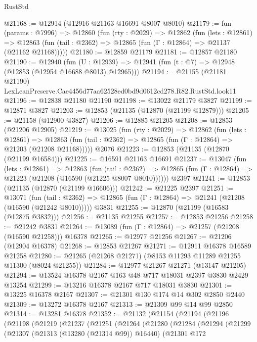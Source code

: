 \begin{lexlean}{RustStd}
\begin{coremodule}
@21168 := @12914 (@12916 @21163 @16691 @8007 @8010)
@21179 := fun (params : @7996) =>
  @12860
    (fun (rty : @2029) =>
    @12862
      (fun (lets : @12861) =>
      @12863 (fun (tail : @2362) => @12865 (fun (Γ : @12864) => @21137 (@21162 @21168)))))
@21180 := @12859 @21179
@21181 := @12857 @21180
@21190 := @12940
    (fun (U : @12939) => @12941 (fun (t : @7) => @12948 (@12853 (@12954 @16688 @8013) @12965)))
@21194 := @21155
    (@21181 @21190)
    LexLeanPreserve.Cae4456d77aa62528ed0bd9d0612cd278.R82.RustStd.look11
@21196 := @12838 @21180 @21190
@21198 := @13022 @21179 @3827
@21199 := @12871 @3827
@21203 := @12853 (@21135 (@12870 (@21199 @12879)))
@21205 := @21158 (@12900 @3827)
@21206 := @12885 @21205
@21208 := @12853 (@21206 @12905)
@21219 := @13025
    (fun (rty : @2029) =>
    @12862
      (fun (lets : @12861) =>
      @12863 (fun (tail : @2362) => @12865 (fun (Γ : @12864) => @21203 (@21208 @21168)))))
    @2076
@21223 := @12853 (@21135 (@12870 (@21199 @16584)))
@21225 := @16591 @21163 @16691
@21237 := @13047
    (fun (lets : @12861) =>
    @12863
      (fun (tail : @2362) =>
      @12865 (fun (Γ : @12864) => @21223 (@21208 (@16590 (@21225 @8007 @8010))))))
    @2397
@21241 := @12853 (@21135 (@12870 (@21199 @16606)))
@21242 := @21225 @2397
@21251 := @13071
    (fun (tail : @2362) => @12865 (fun (Γ : @12864) => @21241 (@21208 (@16590 (@21242 @8010)))))
    @3831
@21255 := @12870 (@21199 (@16583 (@12875 @3832)))
@21256 := @21135 @21255
@21257 := @12853 @21256
@21258 := @21242 @3831
@21264 := @13089 (fun (Γ : @12864) => @21257 (@21208 (@16590 @21258))) @16378
@21265 := @12977 @21256
@21267 := @21206 (@12904 @16378)
@21268 := @12853 @21267
@21271 := @12911 @16378 @16589 @21258
@21280 := @21265 (@21268 @21271) (@8153 @11293 @11289 @21255 @11300 (@8024 @21255))
@21284 := @12977 @21267 @21271 (@13147 @21205)
@21294 := @13524 @16378 @2167 @163 @48 @717 @18031 @2397 @3830 @2429 @13254
@21299 := @13216 @16378 @2167 @717 @18031 @3830
@21301 := @13225 @16378 @2167
@21307 := @21301 @130 @174 @14 @302 @2850 @2440
@21309 := @13272 @16378 @2167
@21313 := @21309 @99 @14 @99 @2850
@21314 := @13281 @16378
@21352 := @21132
    (@21154
      (@21194
        (@21196
          (@21198
            (@21219
              (@21237
                (@21251
                  (@21264
                    (@21280
                      (@21284
                        (@21294
                          (@21299
                            (@21307
                              (@21313 (@13280 (@21314 @99)) @16440)
                              (@21301
                                @172

\end{coremodule}
\end{lexlean}
